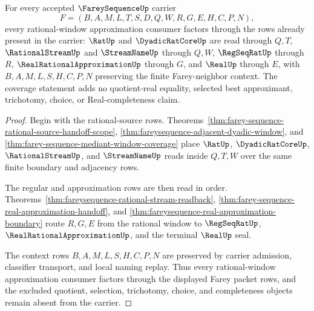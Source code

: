 \begin{theorem}
\label{thm:fareysequence-rational-coverage}
For every accepted $\FareySequenceUp$ carrier
$$
F=(B,A,M,L,T,S,D,Q,W,R,G,E,H,C,P,N),
$$
every rational-window approximation consumer factors through the rows already present in the carrier: $\RatUp$ and $\DyadicRatCoreUp$ are read through $Q,T$, $\RationalStreamUp$ and $\StreamNameUp$ through $Q,W$, $\RegSeqRatUp$ through $R$, $\RealRationalApproximationUp$ through $G$, and $\RealUp$ through $E$, with $B,A,M,L,S,H,C,P,N$ preserving the finite Farey-neighbor context. The coverage statement adds no quotient-real equality, selected best approximant, trichotomy, choice, or Real-completeness claim.
\end{theorem}
\begin{proof}
Begin with the rational-source rows. Theorems~\ref{thm:farey-sequence-rational-source-handoff-scope}, \ref{thm:fareysequence-adjacent-dyadic-window}, and \ref{thm:farey-sequence-mediant-window-coverage} place $\RatUp$, $\DyadicRatCoreUp$, $\RationalStreamUp$, and $\StreamNameUp$ reads inside $Q,T,W$ over the same finite boundary and adjacency rows.

The regular and approximation rows are then read in order. Theorems~\ref{thm:fareysequence-rational-stream-readback}, \ref{thm:farey-sequence-real-approximation-handoff}, and \ref{thm:fareysequence-real-approximation-boundary} route $R,G,E$ from the rational window to $\RegSeqRatUp$, $\RealRationalApproximationUp$, and the terminal $\RealUp$ seal.

The context rows $B,A,M,L,S,H,C,P,N$ are preserved by carrier admission, classifier transport, and local naming replay. Thus every rational-window approximation consumer factors through the displayed Farey packet rows, and the excluded quotient, selection, trichotomy, choice, and completeness objects remain absent from the carrier.
\end{proof}

